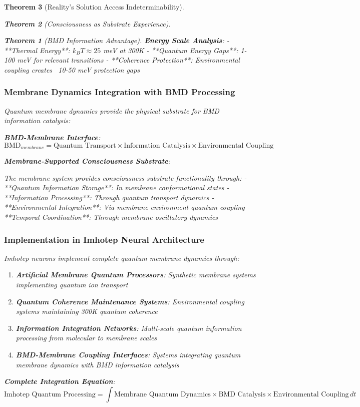 \documentclass[12pt,a4paper]{article}
\newtheorem{theorem}{Theorem}[section]
\theoremstyle{remark}
\begin{document}
\begin{theorem}[Reality's Solution Access Indeterminability]
\begin{theorem}[Consciousness as Substrate Experience]
\begin{theorem}[BMD Information Advantage]
\textbf{Energy Scale Analysis}:
- **Thermal Energy**: $k_B T \approx 25$ meV at 300K
- **Quantum Energy Gaps**: 1-100 meV for relevant transitions  
- **Coherence Protection**: Environmental coupling creates ~10-50 meV protection gaps

\subsubsection{Membrane Dynamics Integration with BMD Processing}

Quantum membrane dynamics provide the physical substrate for BMD information catalysis:

\textbf{BMD-Membrane Interface}:
$$\text{BMD}_{membrane} = \text{Quantum Transport} \times \text{Information Catalysis} \times \text{Environmental Coupling}$$

\textbf{Membrane-Supported Consciousness Substrate}:

The membrane system provides consciousness substrate functionality through:
- **Quantum Information Storage**: In membrane conformational states
- **Information Processing**: Through quantum transport dynamics  
- **Environmental Integration**: Via membrane-environment quantum coupling
- **Temporal Coordination**: Through membrane oscillatory dynamics

\subsubsection{Implementation in Imhotep Neural Architecture}

Imhotep neurons implement complete quantum membrane dynamics through:

\begin{enumerate}
\item \textbf{Artificial Membrane Quantum Processors}: Synthetic membrane systems implementing quantum ion transport
\item \textbf{Quantum Coherence Maintenance Systems}: Environmental coupling systems maintaining 300K quantum coherence  
\item \textbf{Information Integration Networks}: Multi-scale quantum information processing from molecular to membrane scales
\item \textbf{BMD-Membrane Coupling Interfaces}: Systems integrating quantum membrane dynamics with BMD information catalysis
\end{enumerate}

\textbf{Complete Integration Equation}:
$$\text{Imhotep Quantum Processing} = \int \text{Membrane Quantum Dynamics} \times \text{BMD Catalysis} \times \text{Environmental Coupling} \, dt$$


\end{theorem}
\end{theorem}
\end{theorem}
\end{document}
